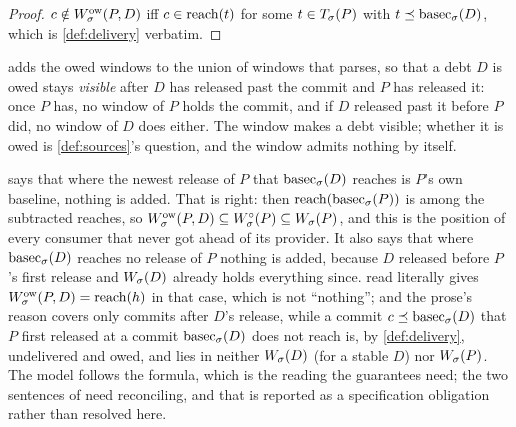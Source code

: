 \begin{proof}
$c \notin W^{\mathrm{ow}}_{\sigma}(P,D)$ iff $c \in \mathrm{reach}(t)$ for some $t \in T_{\sigma}(P)$
with $t \preceq \mathrm{basec}_{\sigma}(D)$, which is \cref{def:delivery} verbatim.
\end{proof}

 adds the owed windows to the union of windows that 
parses, so that a debt $D$ is owed stays \emph{visible} after $D$ has
released past the commit and $P$ has released it: once $P$ has, no window of
$P$ holds the commit, and if $D$ released past it before $P$ did, no window of
$D$ does either. The window makes a debt visible; whether it is owed is
\cref{def:sources}'s question, and the window admits nothing by itself.

\begin{remark}
\label{rem:owedwindow-cases}
 says that where the newest release of $P$ that $\mathrm{basec}_{\sigma}(D)$
reaches is $P$'s own baseline, nothing is added. That is right: then
$\mathrm{reach}(\mathrm{basec}_{\sigma}(P))$ is among the subtracted reaches, so $W^{\mathrm{ow}}_{\sigma}(P,D)
\subseteq W^{\circ}_{\sigma}(P) \subseteq W_{\sigma}(P)$, and this is the position of
every consumer that never got ahead of its provider. It also says that where
$\mathrm{basec}_{\sigma}(D)$ reaches no release of $P$ nothing is added, because $D$
released before $P$'s first release and $W_{\sigma}(D)$ already holds everything
since.  read literally gives $W^{\mathrm{ow}}_{\sigma}(P,D) =
\mathrm{reach}(h)$ in that case, which is not ``nothing''; and the prose's reason
covers only commits after $D$'s release, while a commit $c \preceq \mathrm{basec}_{\sigma}(D)$
that $P$ first released at a commit $\mathrm{basec}_{\sigma}(D)$ does not reach is, by
\cref{def:delivery}, undelivered and owed, and lies in neither
$W_{\sigma}(D)$ (for a stable $D$) nor $W_{\sigma}(P)$. The model follows the
formula, which is the reading the guarantees need; the two sentences of
 need reconciling, and that is reported as a specification
obligation rather than resolved here.
\end{remark}

